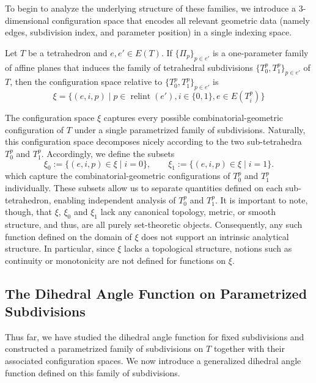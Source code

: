 \documentclass{mainresearch}
\begin{document}
To begin to analyze the underlying structure of these families, we introduce a 3-dimensional configuration space that encodes all relevant geometric data (namely edges, subdivision index, and parameter position) in a single indexing space.

\begin{defin}
	Let $T$ be a tetrahedron and $e,e' \in E(T)$. If $\{\Pi_p\}_{p \in e'}$ is a one-parameter family of affine planes that induces the family of tetrahedral subdivisions $\{T_0^p,T_1^p\}_{p \in e'}$ of $T$, then the configuration space relative to $\{T_0^p,T_1^p\}_{p \in e'}$ is
	\begin{equation}
		\xi = \{(e,i,p) \mid p \in \operatorname{relint} (e'), i \in \{0,1\}, e \in E(T_i^p)\}
	\end{equation}
\end{defin}
The configuration space $\xi$ captures every possible combinatorial-geometric configuration of $T$ under a single parametrized family of subdivisions. Naturally, this configuration space decomposes nicely according to the two sub-tetrahedra $T_0^p$ and $T_1^p$. Accordingly, we define the subsets
\begin{equation}
	\xi_0 := \{(e,i,p)\in \xi \mid i=0\},
	\qquad
	\xi_1 := \{(e,i,p)\in \xi \mid i=1\}.
\end{equation}
which capture the combinatorial-geometric configurations of $T_0^p$ and $T_1^p$ individually. These subsets allow us to separate quantities defined on each sub-tetrahedron, enabling independent analysis of $T_0^p$ and $T_1^p$. It is important to note, though, that $\xi$, $\xi_0$ and $\xi_1$ lack any canonical topology, metric, or smooth structure, and thus, are all purely set-theoretic objects. Consequently, any such function defined on the domain of $\xi$ does not support an intrinsic analytical structure. In particular, since $\xi$ lacks a topological structure, notions such as continuity or monotonicity are not defined for functions on $\xi$. 


\subsection{The Dihedral Angle Function on Parametrized Subdivisions}
Thus far, we have studied the dihedral angle function for fixed subdivisions and constructed a parametrized family of subdivisions on $T$ together with their associated configuration spaces. We now introduce a generalized dihedral angle function defined on this family of subdivisions.
\end{document}
